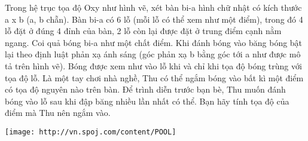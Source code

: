 Trong hệ trục tọa độ Oxy như hình vẽ, xét bàn bi-a hình chữ nhật có kích thước a x b (a, b chẵn). Bàn bi-a có 6 lỗ (mỗi lỗ có thể xem như một điểm), trong đó 4 lỗ đặt ở đúng 4 đỉnh của bàn, 2 lỗ còn lại được đặt ở trung điểm cạnh nằm ngang. Coi quả bóng bi-a như một chất điểm. Khi đánh bóng vào băng bóng bật lại theo định luật phản xạ ánh sáng (góc phản xạ  b bằng góc tới  a như được mô tả trên hình vẽ). Bóng được xem như vào lỗ khi và chỉ khi tọa độ bóng trùng với tọa độ lỗ. Là một tay chơi nhà nghề, Thu có thể ngắm bóng vào bất kì một điểm có tọa độ nguyên nào trên bàn. Để trình diễn trước bạn bè, Thu muốn đánh bóng vào lỗ sau khi đập băng nhiều lần nhất có thể. Bạn hãy tính tọa độ của điểm mà Thu nên ngắm vào.  


\texttt{[image: http://vn.spoj.com/content/POOL]}